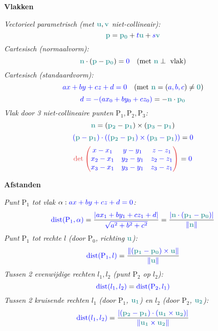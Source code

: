 \documentclass[12pt]{article}
\renewcommand{\vec}[1]{\textcolor{vectorTeal}{\mathbf{#1}}}
\newcommand{\scalar}[1]{\textcolor{scalarBrightBlue}{#1}}
\newcommand{\mat}[1]{\textcolor{matrixSoftRed}{#1}}
\newcommand{\punt}[1]{\mathrm{#1}}
\begin{document}
\vspace{1.5em} %
{\centering
\textcolor{headerBrown}{\large\textbf{Vlakken}}
\par
}%
\textit{Vectorieel parametrisch (met $\vec{u}, \vec{v}$ niet-collineair):}
\[
\vec{p} = \vec{p_0} + \scalar{t} \vec{u} + \scalar{s} \vec{v}
\]
\textit{Cartesisch (normaalvorm):}
\[
\vec{n} \cdot (\vec{p} - \vec{p_0}) = \scalar{0} \quad (\text{met } \vec{n} \perp \text{ vlak})
\]
\textit{Cartesisch (standaardvorm):}
\[
\scalar{a x + b y + c z + d = 0} \quad (\text{met } \vec{n} = (\scalar{a, b, c}) \neq \vec{0})
\]
\[
\scalar{d = - (a x_0 + b y_0 + c z_0)} = - \vec{n} \cdot \vec{p_0}
\]
\textit{Vlak door 3 niet-collineaire punten $\punt{P_1}, \punt{P_2}, \punt{P_3}$:}
\[
\vec{n} = (\vec{p_2} - \vec{p_1}) \times (\vec{p_3} - \vec{p_1})
\]
\[
\scalar{(\vec{p} - \vec{p_1}) \cdot ((\vec{p_2} - \vec{p_1}) \times (\vec{p_3} - \vec{p_1}))} = \scalar{0}
\]
\[
\mat{\det \begin{pmatrix} \scalar{x-x_1} & \scalar{y-y_1} & \scalar{z-z_1} \\ \scalar{x_2-x_1} & \scalar{y_2-y_1} & \scalar{z_2-z_1} \\ \scalar{x_3-x_1} & \scalar{y_3-y_1} & \scalar{z_3-z_1} \end{pmatrix}} = \scalar{0}
\]

\vspace{1.5em} %
{\centering
\textcolor{headerBrown}{\large\textbf{Afstanden}}
\par
}%
\textit{Punt $\punt{P_1}$ tot vlak $\alpha: \scalar{ax+by+cz+d=0}$:}
\[
\scalar{\text{dist}(\punt{P_1}, \alpha)} = \frac{\scalar{|a x_1 + b y_1 + c z_1 + d|}}{\scalar{\sqrt{a^2 + b^2 + c^2}}} = \frac{\scalar{|\vec{n} \cdot (\vec{p_1} - \vec{p_0})|}}{\scalar{\|\vec{n}\|}}
\]
\textit{Punt $\punt{P_1}$ tot rechte $l$ (door $\punt{P_0}$, richting $\vec{u}$):}
\[
\scalar{\text{dist}(\punt{P_1}, l)} = \frac{\scalar{\|(\vec{p_1} - \vec{p_0}) \times \vec{u}\|}}{\scalar{\|\vec{u}\|}}
\]
\textit{Tussen 2 evenwijdige rechten $l_1, l_2$ (punt $\punt{P_2}$ op $l_2$):}
\[
\scalar{\text{dist}(l_1, l_2)} = \scalar{\text{dist}(\punt{P_2}, l_1)}
\]
\textit{Tussen 2 kruisende rechten $l_1$ (door $\punt{P_1}$, $\vec{u_1}$) en $l_2$ (door $\punt{P_2}$, $\vec{u_2}$):}
\[
\scalar{\text{dist}(l_1, l_2)} = \frac{\scalar{|(\vec{p_2} - \vec{p_1}) \cdot (\vec{u_1} \times \vec{u_2})|}}{\scalar{\|\vec{u_1} \times \vec{u_2}\|}}
\]
\end{document}
